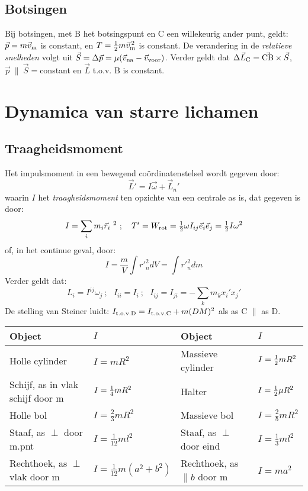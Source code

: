 \subsection{Botsingen}
Bij botsingen, met B het botsingspunt en C een willekeurig ander punt, geldt:\\
$\vec{p}=m\vec{v}_{\rm m}$ is constant, en $T=\mbox{$\frac{1}{2}$} m\vec{v}_{\rm m}^{\,2}$ is
constant. De verandering in de {\it relatieve snelheden} volgt uit
$\vec{S}=\Delta\vec{p}=\mu(\vec{v}_{\rm na}-\vec{v}_{\rm voor})$. Verder geldt dat
$\Delta\vec{L}_{\rm C}=\vec{\rm CB}\times\vec{S}$,
$\vec{p}~\parallel~\vec{S}=$constant en $\vec{L}$ t.o.v. B is constant.

\section{Dynamica van starre lichamen}
\subsection{Traagheidsmoment}
Het impulsmoment in een bewegend co\"ordinatenstelsel wordt gegeven door:
\[
\vec{L}'=I\vec{\omega}+\vec{L}_n'
\]
waarin $I$ het {\it traagheidsmoment} ten opzichte van een centrale as is,
dat gegeven is door:
\[
I=\sum\limits_i m_i\vec{r}_i~^2~;~~~T'=W_{\rm rot}=\mbox{$\frac{1}{2}$}\omega I_{ij}\vec{e}_i\vec{e}_j=\mbox{$\frac{1}{2}$} I\omega^2
\]
of, in het continue geval, door:
\[
I=\frac{m}{V}\int{r'}^2_ndV=\int{r'}^2_ndm
\]
Verder geldt dat:
\[
L_i=I^{ij}\omega_j~;~~~I_{ii}=I_i~;~~~I_{ij}=I_{ji}=-\sum\limits_km_kx_i'x_j'
\]
De stelling van Steiner luidt: $I_{\rm t.o.v. D}=I_{\rm t.o.v. C}+m(DM)^2$
als as C $\parallel$ as D.
\begin{center}
\begin{tabular}{||l|l||l|l||}
\hline
{\bf Object}&$I$&{\bf Object}&$I$\\
\hline
\hline
\rule{0pt}{15pt}Holle cylinder                   &$I=mR^2$             &Massieve cylinder &$I=\mbox{$\frac{1}{2}$} mR^2$\\
\rule{0pt}{15pt}Schijf, as in vlak schijf door m &$I=\mbox{$\frac{1}{4}$} mR^2$      &Halter            &$I=\mbox{$\frac{1}{2}$}\mu R^2$\\
\rule{0pt}{15pt}Holle bol                        &$I=\frac{2}{3}mR^2$  &Massieve bol      &$I=\frac{2}{5}mR^2$\\
\rule{0pt}{15pt}Staaf, as $\perp$ door m.pnt     &$I=\frac{1}{12}ml^2$ &Staaf, as $\perp$ door eind &$I=\frac{1}{3}ml^2$\\
\rule[-5pt]{0pt}{20pt}Rechthoek, as $\perp$ vlak door m&$I=\frac{1}{12}m(a^2+b^2)$&Rechthoek, as $\parallel b$ door m &$I=ma^2$\\
\hline
\end{tabular}
\end{center}

